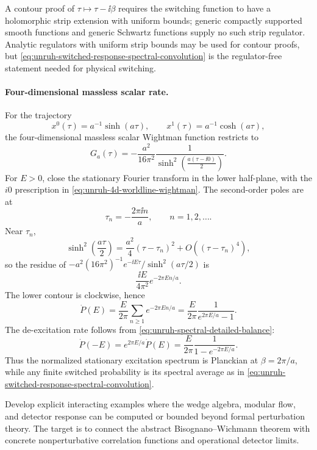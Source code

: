 A contour proof of
\(\tau\mapsto\tau-\ii\beta\) requires the switching function to have a
holomorphic strip extension with uniform bounds; generic compactly supported
smooth functions and generic Schwartz functions supply no such strip
regulator.  Analytic regulators with uniform strip bounds may be used for
contour proofs, but
\eqref{eq:unruh-switched-response-spectral-convolution} is the regulator-free
statement needed for physical switching.

\paragraph{Four-dimensional massless scalar rate.}
For the trajectory
\[
  x^0(\tau)=a^{-1}\sinh(a\tau),\qquad
  x^1(\tau)=a^{-1}\cosh(a\tau),
\]
the four-dimensional massless scalar Wightman function restricts to
\begin{equation}
  G_a(\tau)
  =
  -\frac{a^2}{16\pi^2}
  \frac{1}{\sinh^2\!\left(\frac{a(\tau-\ii0)}{2}\right)} .
  \label{eq:unruh-4d-worldline-wightman}
\end{equation}
For \(E>0\), close the stationary Fourier transform in the lower half-plane,
with the \(i0\) prescription in \eqref{eq:unruh-4d-worldline-wightman}.  The
second-order poles are at
\[
  \tau_n=-\frac{2\pi\ii n}{a},\qquad n=1,2,\ldots .
\]
Near \(\tau_n\),
\[
  \sinh^2\!\left(\frac{a\tau}{2}\right)
  =
  \frac{a^2}{4}(\tau-\tau_n)^2+O((\tau-\tau_n)^4),
\]
so the residue of
\(-a^2(16\pi^2)^{-1}e^{-\ii E\tau}/\sinh^2(a\tau/2)\) is
\[
  \frac{\ii E}{4\pi^2}e^{-2\pi En/a}.
\]
The lower contour is clockwise, hence
\begin{equation}
  \dot P(E)
  =
  \frac{E}{2\pi}
  \sum_{n\ge1}e^{-2\pi En/a}
  =
  \frac{E}{2\pi}
  \frac{1}{e^{2\pi E/a}-1}.
  \label{eq:unruh-4d-planck-rate}
\end{equation}
The de-excitation rate follows from
\eqref{eq:unruh-spectral-detailed-balance}:
\[
  \dot P(-E)
  =
  e^{2\pi E/a}\dot P(E)
  =
  \frac{E}{2\pi}\frac{1}{1-e^{-2\pi E/a}} .
\]
Thus the normalized stationary excitation spectrum is Planckian at
\(\beta=2\pi/a\), while any finite switched probability is its spectral
average as in
\eqref{eq:unruh-switched-response-spectral-convolution}.

\begin{openproblem}
\label{op:interacting-wedge-thermality-examples}
Develop explicit interacting examples where the wedge algebra, modular flow,
and detector response can be computed or bounded beyond formal perturbation
theory.  The target is to connect the abstract Bisognano--Wichmann theorem
with concrete nonperturbative correlation functions and operational detector
limits.
\end{openproblem}

